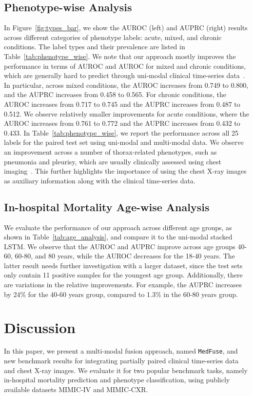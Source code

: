 \documentclass[pmlr]{jmlr}
\begin{document}
\subsection{Phenotype-wise Analysis}
In Figure~\ref{fig:types_bar}, we show the AUROC (left) and AUPRC (right) results across different categories of phenotype labels: acute, mixed, and chronic conditions. The label types and their prevalence are listed in Table~\ref{tab:phenotype_wise}. We note that our approach mostly improves the performance in terms of AUROC and AUROC for mixed and chronic conditions, which are generally hard to predict through uni-modal clinical time-series data~\citep{benchhmark}. In particular, across mixed conditions, the AUROC increases from 0.749 to 0.800, and the AUPRC increases from 0.458 to 0.565. For chronic conditions, the AUROC increases from 0.717 to 0.745 and the AUPRC increases from 0.487 to 0.512. We observe relatively smaller improvements for acute conditions, where the AUROC increases from 0.761 to 0.772 and the AUPRC increases from 0.432 to 0.433. In Table~\ref{tab:phenotype_wise}, we report the performance across all 25 labels for the paired test set using uni-modal and multi-modal data. We observe an improvement across a number of thorax-related phenotypes, such as pneumonia and pleurisy, which are usually clinically assessed using chest imaging~\citep{long2017emergency}. This further highlights the importance of using the chest X-ray images as auxiliary information along with the clinical time-series data.

\vspace{-2mm}
\subsection{In-hospital Mortality Age-wise Analysis}
We evaluate the performance of our approach across different age groups, as shown in  Table~\ref{tab:age_analysis}, and compare it to the uni-modal stacked LSTM. We observe that the AUROC and AUPRC improve across age groups 40-60, 60-80, and 80 years, while the AUROC decreases for the 18-40 years. The latter result needs further investigation with a larger dataset, since the test sets only contain 11 positive samples for the youngest age group. Additionally, there are variations in the relative improvements. For example, the AUPRC increases by 24\% for the 40-60 years group, compared to 1.3\% in the 60-80 years group. 





\section{Discussion}
In this paper, we present a multi-modal fusion approach, named \texttt{MedFuse}, and new benchmark results for integrating partially paired clinical time-series data and chest X-ray images. We evaluate it for two popular benchmark tasks, namely in-hospital mortality prediction and phenotype classification, using publicly available datasets MIMIC-IV and MIMIC-CXR.  
\end{document}
